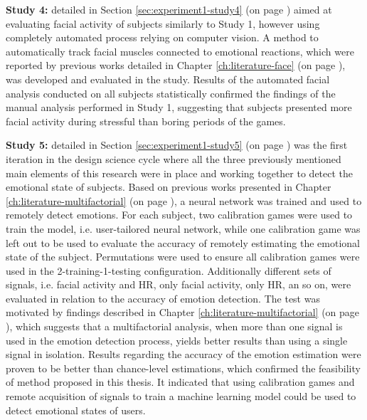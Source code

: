 \textbf{Study 4:} detailed in Section \ref{sec:experiment1-study4} (on page \pageref{sec:experiment1-study4}) aimed at evaluating facial activity of subjects similarly to Study 1, however using completely automated process relying on computer vision. A method to automatically track facial muscles connected to emotional reactions, which were reported by previous works detailed in Chapter \ref{ch:literature-face} (on page \pageref{ch:literature-face}), was developed and evaluated in the study. Results of the automated facial analysis conducted on all subjects statistically confirmed the findings of the manual analysis performed in Study 1, suggesting that subjects presented more facial activity during stressful than boring periods of the games.

\textbf{Study 5:} detailed in Section \ref{sec:experiment1-study5} (on page \pageref{sec:experiment1-study5}) was the first iteration in the design science cycle where all the three previously mentioned main elements of this research were in place and working together to detect the emotional state of subjects. Based on previous works presented in Chapter \ref{ch:literature-multifactorial} (on page \pageref{ch:literature-multifactorial}), a neural network was trained and used to remotely detect emotions. For each subject, two calibration games were used to train the model, i.e. user-tailored neural network, while one calibration game was left out to be used to evaluate the accuracy of remotely estimating the emotional state of the subject. Permutations were used to ensure all calibration games were used in the 2-training-1-testing configuration. Additionally different sets of signals, i.e. facial activity and HR, only facial activity, only HR, an so on, were evaluated in relation to the accuracy of emotion detection. The test was motivated by findings described in Chapter \ref{ch:literature-multifactorial} (on page \pageref{ch:literature-multifactorial}), which suggests that a multifactorial analysis, when more than one signal is used in the emotion detection process, yields better results than using a single signal in isolation. Results regarding the accuracy of the emotion estimation were proven to be better than chance-level estimations, which confirmed the feasibility of method proposed in this thesis. It indicated that using calibration games and remote acquisition of signals to train a machine learning model could be used to detect emotional states of users.

